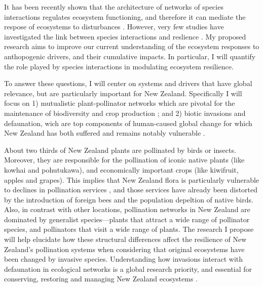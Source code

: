 \documentclass[a4paper]{report}
\begin{document}
It has been recently shown that the architecture of networks of species interactions regulates ecosystem functioning, and therefore it can mediate the respose of ecosystems to disturbances \citep{Rezende2007, Bastolla2009, Berlow2009, Stouffer2010, Stouffer2012}. 
However, very few studies have investigated the link between species interactions and reslience \citep{Lever2014, Tylianakis2014}. 
My proposed research aims to improve our current understanding of the ecosystem responses to anthopogenic drivers, and their cumulative impacts. 
In particular, I will quantify the role played by species interactions in modulating ecosystem resilience.

To answer these questions, I will center on systems and drivers that have global relevance, but are particularly important for New Zealand. 
Specifically I will focus on 1) mutualistic plant-pollinator networks which are pivotal for the maintenance of biodiversity and crop production \citep{Bascompte2007, Klein2007}; and 2) biotic invasions and defaunation, wich are top components of human-caused global change for which New Zealand has both suffered and remains notably vulnerable \citep{Vitousek1997}. 

About two thirds of New Zealand plants are pollinated by birds or insects. 
Moreover, they are responsible for the pollination of iconic native plants (like kowhai and pohutukawa), and economically important crops (like kiwifruit, apples and grapes). 
This implies that New Zealand flora is particularly vulnerable to declines in pollination services \citep{Newstrom2005}, and those services have already been distorted by the introduction of foreign bees \citep{Huryn1995} and the population depeltion of native birds\citep{Anderson2003, Robertson2009}.
Also, in contrast with other locations, pollination networks in New Zealand are dominated by generalist species\citep{Heine1937, Primack1983}---plants that attract a wide range of pollinator species, and pollinators that visit a wide range of plants. 
The research I propose will help elucidate how these structural differences affect the resilience of New Zealand's pollination systems when considering that original ecosystems have been changed by invasive species.
Understanding how invasions interact with defaunation in ecological networks is a global research priority, and essential for conserving, restoring and managing New Zealand ecosystems \citep{Newstrom2005}. 
\end{document}
